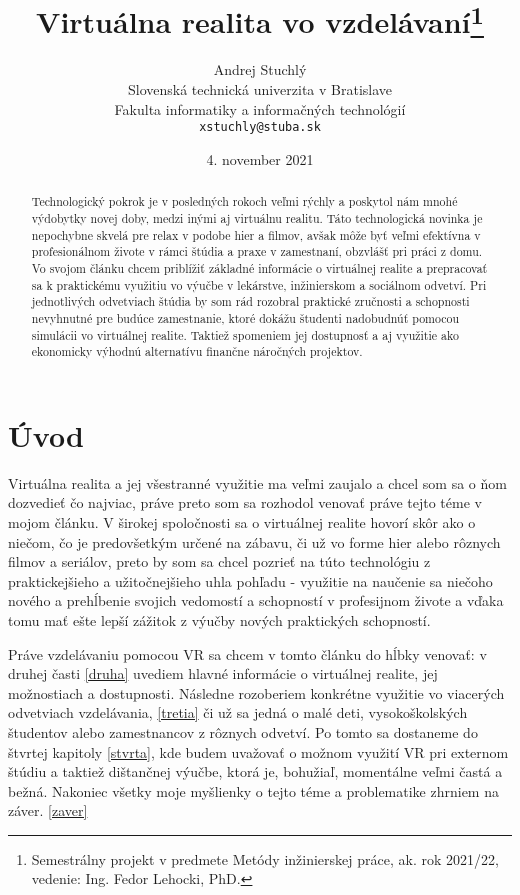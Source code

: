 \documentclass[10pt,twoside,slovak,a4paper]{article}
\title{Virtuálna realita vo vzdelávaní\thanks{Semestrálny projekt v predmete Metódy inžinierskej práce, ak. rok 2021/22, vedenie: Ing. Fedor Lehocki, PhD.}}
\author{Andrej Stuchlý\\[2pt]
	{\small Slovenská technická univerzita v Bratislave}\\
	{\small Fakulta informatiky a informačných technológií}\\
	{\small \texttt{xstuchly@stuba.sk}}
	}
\date{\small 4. november 2021}
\begin{document}
\maketitle

\begin{abstract}
Technologický pokrok je v posledných rokoch veľmi rýchly a poskytol nám mnohé výdobytky novej doby, medzi inými aj virtuálnu realitu. Táto technologická novinka je nepochybne skvelá pre relax v podobe hier a filmov, avšak môže byť veľmi efektívna v profesionálnom živote v rámci štúdia a praxe v zamestnaní, obzvlášť pri práci z domu. Vo svojom článku chcem priblížiť základné informácie o virtuálnej realite a prepracovať sa k  praktickému využitiu vo výučbe v lekárstve, inžinierskom a sociálnom odvetví. Pri jednotlivých odvetviach štúdia by som rád rozobral praktické zručnosti a schopnosti nevyhnutné pre budúce zamestnanie, ktoré dokážu študenti nadobudnúť pomocou simulácii vo virtuálnej realite. Taktiež spomeniem jej dostupnosť a aj využitie ako ekonomicky výhodnú alternatívu finančne náročných projektov. 
\end{abstract}


\section{Úvod}
Virtuálna realita a jej všestranné využitie ma veľmi zaujalo a chcel som sa o ňom dozvedieť čo najviac, práve preto som sa rozhodol venovať práve tejto téme v mojom článku. V širokej spoločnosti sa o virtuálnej realite hovorí skôr ako o niečom, čo je predovšetkým určené na zábavu, či už vo forme hier alebo rôznych filmov a seriálov, preto by som sa chcel pozrieť na túto technológiu z praktickejšieho a užitočnejšieho uhla pohľadu - využitie na naučenie sa niečoho nového a prehĺbenie svojich vedomostí a schopností v profesijnom živote a vďaka tomu mať ešte lepší zážitok z výučby nových praktických schopností.

Práve vzdelávaniu pomocou VR sa chcem v tomto článku do hĺbky venovať: v druhej časti \ref{druha} uvediem hlavné informácie o virtuálnej realite, jej možnostiach a dostupnosti. Následne rozoberiem konkrétne využitie vo viacerých odvetviach vzdelávania, \ref{tretia} či už sa jedná o malé deti, vysokoškolských študentov alebo zamestnancov z rôznych odvetví. Po tomto sa dostaneme do štvrtej kapitoly \ref{stvrta}, kde budem uvažovať o možnom využití VR pri externom štúdiu a taktiež dištančnej výučbe, ktorá je, bohužiaľ, momentálne veľmi častá a bežná. Nakoniec všetky moje myšlienky o tejto téme a problematike zhrniem na záver. \ref{zaver}
\end{document}

